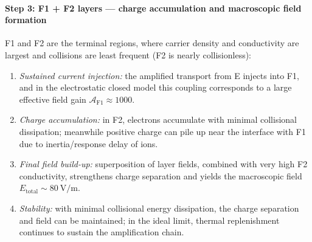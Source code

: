 \documentclass[11pt,a4paper]{article}
\begin{document}
\paragraph{Step 3: F1 + F2 layers --- charge accumulation and macroscopic field formation}
F1 and F2 are the terminal regions, where carrier density and conductivity are largest and collisions are least frequent (F2 is nearly collisionless):
\begin{enumerate}
  \item \emph{Sustained current injection:} the amplified transport from E injects into F1, and in the electrostatic closed model this coupling corresponds to a large effective field gain $\mathcal{A}_{\mathrm{F1}}\approx 1000$.
  \item \emph{Charge accumulation:} in F2, electrons accumulate with minimal collisional dissipation; meanwhile positive charge can pile up near the interface with F1 due to inertia/response delay of ions.
  \item \emph{Final field build-up:} superposition of layer fields, combined with very high F2 conductivity, strengthens charge separation and yields the macroscopic field $E_{\mathrm{total}}\sim 80\ \mathrm{V/m}$.
  \item \emph{Stability:} with minimal collisional energy dissipation, the charge separation and field can be maintained; in the ideal limit, thermal replenishment continues to sustain the amplification chain.
\end{enumerate}
\end{document}
